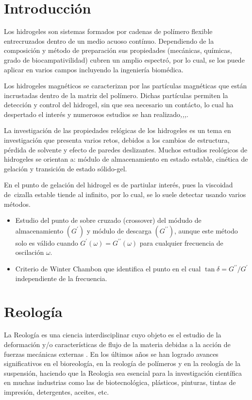 \documentclass[review]{elsarticle}
\begin{document}
\section{Introducci\'on}
Los hidrogeles son sistemas formados por cadenas de pol\'imero flexible entrecruzados dentro de un medio acuoso cont\'inuo. Dependiendo de la composici\'on y m\'etodo de preparaci\'on sus propiedades (mec\'anicas, qu\'imicas, grado de biocampativilidad) cubren un amplio espectr\'o, por lo cual, se los puede aplicar en varios campos incluyendo la ingenier\'ia biom\'edica.

Los hidrogeles magn\'eticos se caracterizan por las part\'iculas magn\'eticas que est\'an incrustadas dentro de la matriz del pol\'imero\emph{\cite{ADFM:ADFM201201708}}.
Dichas part\'iculas permiten la detecci\'on y control del hidrogel, sin que sea necesario un cont\'acto, lo cual ha despertado el inter\'es y numerosos estudios se han realizado\emph{\cite{Lopez-Lopez2015},\cite{KIM20124836},\cite{C6NR00224B},\cite{LopezLopez2017110}}.

La investigaci\'on de las propiedades rel\'ogicas de los hidrogeles es un tema en investigaci\'on que presenta varios retos, debidos a los cambios de estructura, p\'erdida de solvente y efecto de paredes deslizantes. Muchos estudios reol\'ogicos de hidrogeles se orientan a: m\'odulo de almacenamiento en estado estable, cin\'etica de gelaci\'on y transici\'on de estado s\'olido-gel.

En el punto de gelaci\'on del hidrogel es de partiular inter\'es, pues la viscoidad de\ cizalla estable tiende al infinito, por lo cual, se lo suele detectar usando varios m\'etodos.


\begin{itemize}
\item Estudio del punto de sobre cruzado (crossover) del m\'odudo de almacenamiento $\left (G^{ \prime }\right )$ y m\'odulo de descarga $\left (G^{ \prime  \prime }\right )$, aunque este m\'etodo solo es v\'alido cuando $G^{ \prime } \left (\omega \right ) =G^{ \prime  \prime } \left (\omega \right )$ para cualquier frecuencia de oscilaci\'on $\omega $.

\item Criterio de Winter Chambon que identifica el punto en el cual $\tan  \delta  =G^{ \prime  \prime }/G^{ \prime }$ independiente de la frecuencia. \end{itemize}

\section{Reolog\'ia}
La Reolog\'ia es una ciencia interdisciplinar cuyo objeto es el estudio de la deformaci\'on y/o caracter\'isticas de flujo de la materia debidas a la acci\'on de fuerzas mec\'anicas externas \cite{9780851864433}.
En los \'ultimos a\~nos se han logrado avances significativos en el bioreolog\'ia, en la reolog\'ia de pol\'imeros y en la reolog\'ia de la suspensi\'on, haciendo que la Reologia sea esencial para la investigaci\'on cient\'ifica en muchas industrias como las de biotecnol\'ogica, pl\'asticos, pinturas, tintas de impresi\'on, detergentes, aceites, etc\cite{Barnes1989}.
\end{document}
